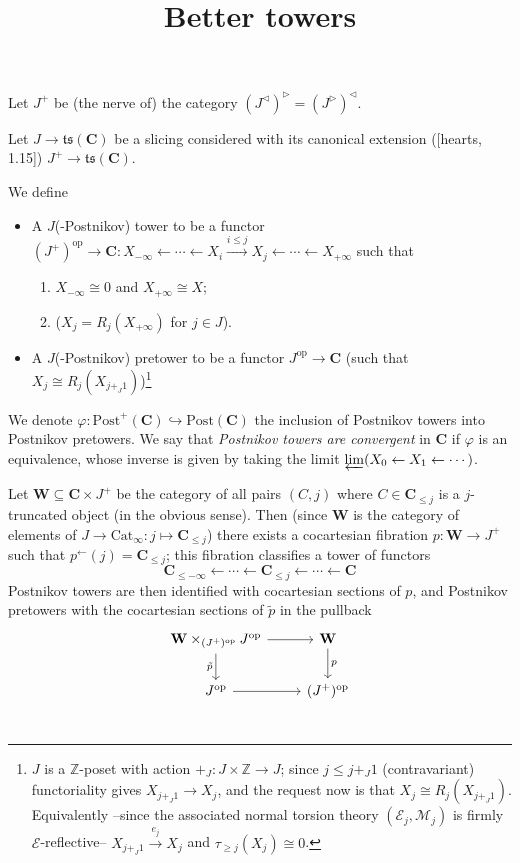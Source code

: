 \documentclass{article}
\title{Better towers}
\def\ts{\mathfrak{ts}}
\def\C{\mathbf{C}}
\def\H{\C}
\def\E{\mathcal{E}}
\def\M{\mathcal{M}}
\begin{document}
\maketitle
Let $J^+$ be (the nerve of) the category $(J^\lhd)^\rhd = (J^\rhd)^\lhd$.

Let $J \to \ts(\C)$ be a slicing considered with its canonical extension ([hearts, 1.15]) $J^+  \to \ts(\C)$.

We define
\begin{itemize}
	\item A $J$(-Postnikov) tower to be a functor $(J^+)^\text{op} \to \C: X_{-\infty} \leftarrow \cdots \leftarrow X_i \xrightarrow{i\le j} X_j \leftarrow \cdots \leftarrow X_{+\infty}$ such that 
	\begin{enumerate}
		\item $X_{-\infty}\cong 0$ and $X_{+\infty}\cong X$;
		\item ($X_j = R_j(X_{+\infty})$ for $j\in J$).
	\end{enumerate}
	\item A $J$(-Postnikov) pretower to be a functor $J^\text{op}\to \C$ (such that $X_j \cong R_j(X_{j +_J 1})$)\footnote{$J$ is a $\mathbb{Z}$-poset with action $+_J\colon J\times\mathbb Z\to J$; since $j\le j +_J 1$ (contravariant) functoriality gives $X_{j +_J 1} \to X_j$, and the request now is that $X_j \cong R_j(X_{j +_J 1})$. Equivalently --since the associated normal torsion theory $(\E_j,\M_j)$ is firmly $\E$-reflective-- $X_{j +_J 1} \xrightarrow{e_j} X_j$ and $\tau_{\ge j}(X_j)\cong 0$.}
\end{itemize}
We denote $\varphi \colon \text{Post}^+(\H) \hookrightarrow \text{Post}(\H)$ the inclusion of Postnikov towers into Postnikov pretowers. We say that \emph{Postnikov towers are convergent} in $\H$ if $\varphi$ is an equivalence, whose inverse is given by taking the limit $\varprojlim (X_0\leftarrow X_1\leftarrow \cdots)$.

Let $\mathbf{W}\subseteq \H \times J^+$ be the category of all pairs $(C,j)$ where $C\in\H_{\le j}$ is a $j$-truncated object (in the obvious sense). Then (since $\mathbf{W}$ is the category of elements of $J\to \text{Cat}_\infty \colon j\mapsto \H_{\le j}$) there exists a cocartesian fibration $p \colon \mathbf{W} \to J^+$ such that $p^\leftarrow(j) = \H_{\le j}$; this fibration classifies a tower of functors
\[
\H_{\le -\infty} \leftarrow \cdots\leftarrow \H_{\le j}\leftarrow \cdots \leftarrow \H
\]
Postnikov towers are then identified with cocartesian sections of $p$, and Postnikov pretowers with the cocartesian sections of $\tilde p$ in the pullback
\[
\begin{tikzcd}
\mathbf{W}\times_{(J^+)^\text{op}}J^\text{op} \ar[r]\ar[d,"\tilde p"'] &\mathbf{W}\ar[d,"p"] \\
J^\text{op}   \ar[r]                                     &(J^+)^\text{op}\\
\end{tikzcd}
\]
\end{document}
